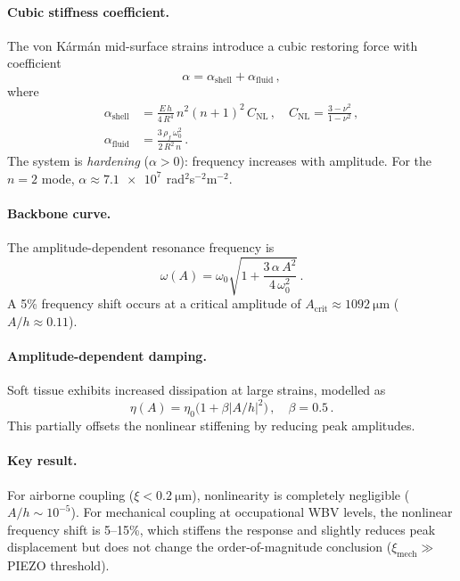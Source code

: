 \documentclass[12pt]{article}
\begin{document}
\paragraph{Cubic stiffness coefficient.}
The von Kármán mid-surface strains introduce a cubic restoring force with
coefficient
\begin{equation}
  \alpha = \alpha_{\mathrm{shell}} + \alpha_{\mathrm{fluid}}\,,
  \tag{S23}
\end{equation}
where
\begin{align}
  \alpha_{\mathrm{shell}} &= \frac{E\,h}{4\,R^{4}}\,n^{2}(n+1)^{2}\,C_{\mathrm{NL}}\,,
    \quad C_{\mathrm{NL}} = \frac{3-\nu^{2}}{1-\nu^{2}}\,,
    \tag{S24} \\
  \alpha_{\mathrm{fluid}} &= \frac{3\,\rho_{f}\,\omega_{0}^{2}}{2\,R^{2}\,n} \,.
    \tag{S25}
\end{align}
The system is \emph{hardening} ($\alpha > 0$): frequency increases with
amplitude.  For the $n=2$ mode, $\alpha \approx \SI{7.1e7}{}$\,rad$^{2}$s$^{-2}$m$^{-2}$.

\paragraph{Backbone curve.}
The amplitude-dependent resonance frequency is
\begin{equation}
  \omega(A) = \omega_{0}\sqrt{1 + \frac{3\,\alpha\,A^{2}}{4\,\omega_{0}^{2}}} \,.
  \tag{S26}
\end{equation}
A 5\% frequency shift occurs at a critical amplitude of
$A_{\mathrm{crit}} \approx \SI{1092}{\micro\metre}$ ($A/h \approx 0.11$).

\paragraph{Amplitude-dependent damping.}
Soft tissue exhibits increased dissipation at large strains, modelled as
\begin{equation}
  \eta(A) = \eta_{0}\bigl(1 + \beta|A/h|^{2}\bigr)\,,\quad \beta = 0.5 \,.
  \tag{S27}
\end{equation}
This partially offsets the nonlinear stiffening by reducing peak amplitudes.

\paragraph{Key result.}
For airborne coupling ($\xi < \SI{0.2}{\micro\metre}$), nonlinearity is
completely negligible ($A/h \sim 10^{-5}$).  For mechanical coupling at
occupational WBV levels, the nonlinear frequency shift is 5--15\%, which
stiffens the response and slightly reduces peak displacement but does not
change the order-of-magnitude conclusion ($\xi_{\mathrm{mech}} \gg$
PIEZO threshold).
\end{document}
